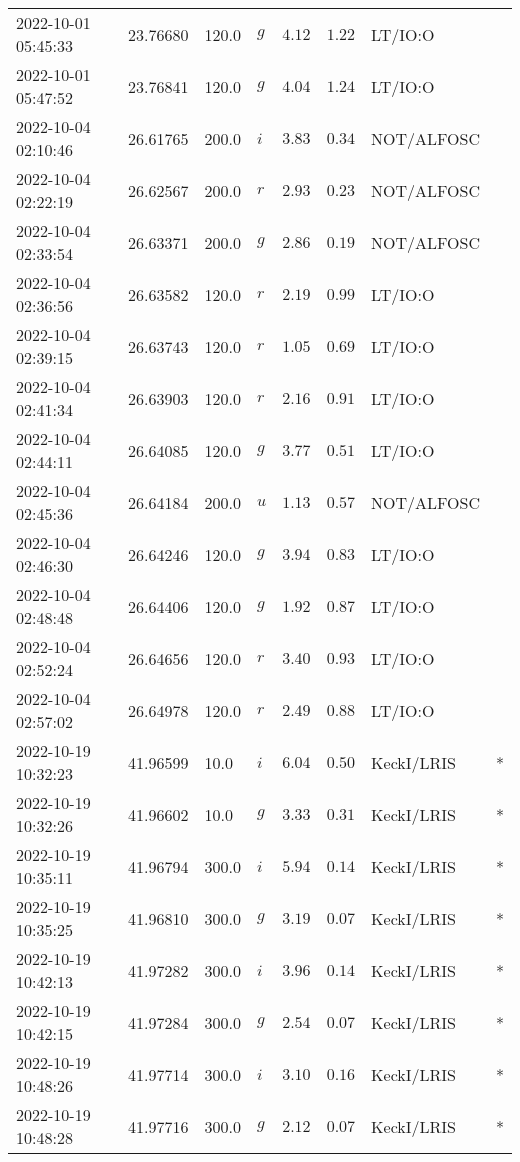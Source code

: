 \documentclass{nature_plusfigure}
\begin{document}
\begin{supplement}
\begin{center}
\begin{longtable}{llllllll}
2022-10-01 05:45:33 & 23.76680 & 120.0 & $g$ & $4.12$ & $1.22$ & LT/IO:O &  \\ 
2022-10-01 05:47:52 & 23.76841 & 120.0 & $g$ & $4.04$ & $1.24$ & LT/IO:O &  \\ 
2022-10-04 02:10:46 & 26.61765 & 200.0 & $i$ & $3.83$ & $0.34$ & NOT/ALFOSC &  \\ 
2022-10-04 02:22:19 & 26.62567 & 200.0 & $r$ & $2.93$ & $0.23$ & NOT/ALFOSC &  \\ 
2022-10-04 02:33:54 & 26.63371 & 200.0 & $g$ & $2.86$ & $0.19$ & NOT/ALFOSC &  \\ 
2022-10-04 02:36:56 & 26.63582 & 120.0 & $r$ & $2.19$ & $0.99$ & LT/IO:O &  \\ 
2022-10-04 02:39:15 & 26.63743 & 120.0 & $r$ & $1.05$ & $0.69$ & LT/IO:O &  \\ 
2022-10-04 02:41:34 & 26.63903 & 120.0 & $r$ & $2.16$ & $0.91$ & LT/IO:O &  \\ 
2022-10-04 02:44:11 & 26.64085 & 120.0 & $g$ & $3.77$ & $0.51$ & LT/IO:O &  \\ 
2022-10-04 02:45:36 & 26.64184 & 200.0 & $u$ & $1.13$ & $0.57$ & NOT/ALFOSC &  \\ 
2022-10-04 02:46:30 & 26.64246 & 120.0 & $g$ & $3.94$ & $0.83$ & LT/IO:O &  \\ 
2022-10-04 02:48:48 & 26.64406 & 120.0 & $g$ & $1.92$ & $0.87$ & LT/IO:O &  \\ 
2022-10-04 02:52:24 & 26.64656 & 120.0 & $r$ & $3.40$ & $0.93$ & LT/IO:O &  \\ 
2022-10-04 02:57:02 & 26.64978 & 120.0 & $r$ & $2.49$ & $0.88$ & LT/IO:O &  \\ 
2022-10-19 10:32:23 & 41.96599 & 10.0 & $i$ & $6.04$ & $0.50$ & KeckI/LRIS & * \\ 
2022-10-19 10:32:26 & 41.96602 & 10.0 & $g$ & $3.33$ & $0.31$ & KeckI/LRIS & * \\ 
2022-10-19 10:35:11 & 41.96794 & 300.0 & $i$ & $5.94$ & $0.14$ & KeckI/LRIS & * \\ 
2022-10-19 10:35:25 & 41.96810 & 300.0 & $g$ & $3.19$ & $0.07$ & KeckI/LRIS & * \\ 
2022-10-19 10:42:13 & 41.97282 & 300.0 & $i$ & $3.96$ & $0.14$ & KeckI/LRIS & * \\ 
2022-10-19 10:42:15 & 41.97284 & 300.0 & $g$ & $2.54$ & $0.07$ & KeckI/LRIS & * \\ 
2022-10-19 10:48:26 & 41.97714 & 300.0 & $i$ & $3.10$ & $0.16$ & KeckI/LRIS & * \\ 
2022-10-19 10:48:28 & 41.97716 & 300.0 & $g$ & $2.12$ & $0.07$ & KeckI/LRIS & * \\ 

\end{longtable}
\end{center}
\end{supplement}
\end{document}
